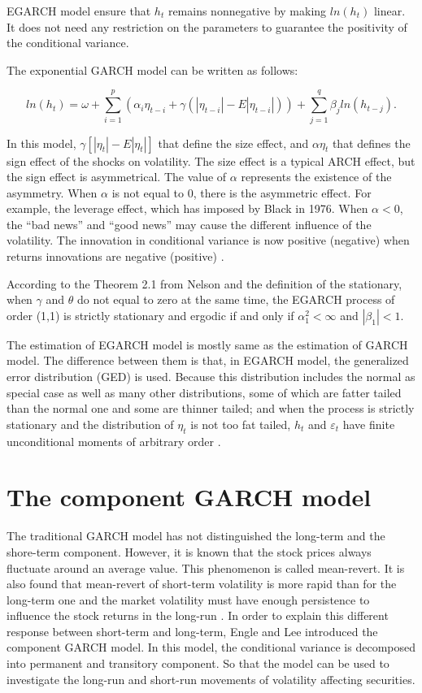EGARCH model ensure that $h_{t}$  remains nonnegative by making $ln(h_{t})$ linear. It does not need any restriction on the parameters to guarantee the positivity of the conditional variance.

The exponential GARCH model can be written as follows:

\begin{equation}
ln(h_t) =\omega + \sum_{i=1}^p(\alpha_i\eta_{t-i}+\gamma(|\eta_{t-i}|-E|\eta_{t-i}|))+\sum_{j=1}^q\beta_jln(h_{t-j}).
\end{equation}

In this model, $\gamma[|\eta_t|-E|\eta_t|]$ that define the size effect, and  $\alpha\eta_t$   that defines the sign effect of the shocks on volatility. The size effect is a typical ARCH effect, but the sign effect is asymmetrical. The value of $\alpha$ represents the existence of the asymmetry.  When $\alpha$ is not equal to 0, there is the asymmetric effect.  For example, the leverage effect, which has imposed by Black in 1976. When $\alpha<0$, the ``bad news'' and ``good news'' may cause the different influence of the volatility. The innovation in conditional variance is now positive (negative) when returns innovations are negative (positive) \citep{Nelson1991}.

According to the Theorem 2.1 from Nelson and the definition of the stationary, when $\gamma$  and $\theta$  do not equal to zero at the same time, the EGARCH process of order (1,1) is strictly stationary and ergodic if and only if $\alpha_1^2 < \infty$ and $|\beta_1|<1$. 

The estimation of EGARCH model is mostly same as the estimation of GARCH model. The difference between them is that, in EGARCH model, the generalized error distribution (GED) is used. Because this distribution includes the normal as special case as well as many other distributions, some of which are fatter tailed than the normal one and some are thinner tailed; and when the process is strictly stationary and the distribution of  $\eta_t$ is not too fat tailed, $h_t$ and $\varepsilon_t$ have finite unconditional moments of arbitrary order \citep{Nelson1991}.

\section{The component GARCH model}

The traditional GARCH model has not distinguished the long-term and the shore-term component. However, it is known that the stock prices always fluctuate around an average value. This phenomenon is called mean-revert. It is also found that mean-revert of short-term volatility is more rapid than for the long-term one and the market volatility must have enough persistence to influence the stock returns in the long-run \citep{XinzhongXuandStephenJ.Taylor1994}. In order to explain this different response between short-term and long-term, Engle and Lee introduced the component GARCH model. In this model, the conditional variance is decomposed into permanent and transitory component. So that the model can be used to investigate the long-run and short-run movements of volatility affecting securities.

